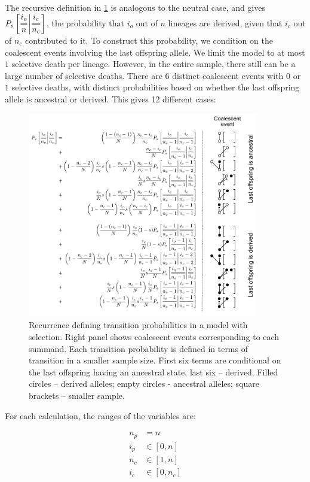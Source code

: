 \documentclass[review]{elsarticle}
\newcommand{\Dfrac}[2]{%
  \ooalign{%
    $\genfrac{}{}{1.2pt}0{#1}{#2}$\cr%
    $\color{white}\genfrac{}{}{.4pt}0{\phantom{#1}}{\phantom{#2}}$}%
}
\newcommand{\cond}{\middle\vert}
\begin{document}
The recursive definition in \ref{fig:rec-selection} is analogous to the neutral case, and gives
$P_s\left[ \Dfrac{i_o}{n} \cond \Dfrac{i_c}{n_c} \right]$, the probability that $i_o$ out of $n$
lineages are derived, given that $i_c$ out of $n_c$ contributed to it. To construct this
probability, we condition on the coalescent events involving the last offspring allele. We limit the
model to at most $1$ selective death per lineage. However, in the entire sample, there still can be
a large number of selective deaths. There are 6 distinct coalescent events with $0$ or $1$ selective
deaths, with distinct probabilities based on whether the last offspring allele is ancestral or
derived. This gives 12 different cases:


\begin{figure}
  \centering
  \includegraphics[width=0.9\textwidth]{fig/recurrence-selection-annotated.pdf}
  \caption{Recurrence defining transition probabilities in a model with selection. Right panel
    shows coalescent events corresponding to each summand. Each transition probability is defined in
    terms of transition in a smaller sample size. First six terms are conditional on the last
    offspring having an ancestral state, last six -- derived. Filled circles -- derived alleles;
    empty circles - ancestral alleles; square brackets -- smaller sample.}
  \label{fig:rec-selection}
\end{figure}

For each calculation, the ranges of the variables are:

\begin{equation}
  \begin{aligned}
    n_p &= n \\
    i_p &\in [0, n] \\
    n_c &\in [1, n] \\
    i_c &\in [0, n_c] \\
  \end{aligned}
\end{equation}
\end{document}
